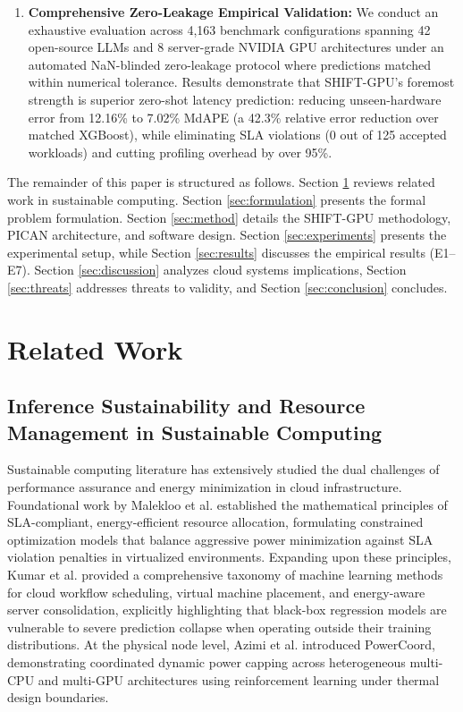 \documentclass[preprint,12pt]{elsarticle}
\begin{document}
\begin{enumerate}
    \item \textbf{Comprehensive Zero-Leakage Empirical Validation:} We conduct an exhaustive evaluation across 4,163 benchmark configurations spanning 42 open-source LLMs and 8 server-grade NVIDIA GPU architectures under an automated NaN-blinded zero-leakage protocol where predictions matched within numerical tolerance. Results demonstrate that SHIFT-GPU's foremost strength is superior zero-shot latency prediction: reducing unseen-hardware error from 12.16\% to 7.02\% MdAPE (a 42.3\% relative error reduction over matched XGBoost), while eliminating SLA violations (0 out of 125 accepted workloads) and cutting profiling overhead by over 95\%.
\end{enumerate}

The remainder of this paper is structured as follows. Section \ref{sec:related} reviews related work in sustainable computing. Section \ref{sec:formulation} presents the formal problem formulation. Section \ref{sec:method} details the SHIFT-GPU methodology, PICAN architecture, and software design. Section \ref{sec:experiments} presents the experimental setup, while Section \ref{sec:results} discusses the empirical results (E1--E7). Section \ref{sec:discussion} analyzes cloud systems implications, Section \ref{sec:threats} addresses threats to validity, and Section \ref{sec:conclusion} concludes.

\section{Related Work}
\label{sec:related}

\subsection{Inference Sustainability and Resource Management in Sustainable Computing}
Sustainable computing literature has extensively studied the dual challenges of performance assurance and energy minimization in cloud infrastructure. Foundational work by Malekloo et al. \citep{suscom_malekloo2018} established the mathematical principles of SLA-compliant, energy-efficient resource allocation, formulating constrained optimization models that balance aggressive power minimization against SLA violation penalties in virtualized environments. Expanding upon these principles, Kumar et al. \citep{suscom_kumar2022} provided a comprehensive taxonomy of machine learning methods for cloud workflow scheduling, virtual machine placement, and energy-aware server consolidation, explicitly highlighting that black-box regression models are vulnerable to severe prediction collapse when operating outside their training distributions. At the physical node level, Azimi et al. \citep{suscom_powercoord2020} introduced PowerCoord, demonstrating coordinated dynamic power capping across heterogeneous multi-CPU and multi-GPU architectures using reinforcement learning under thermal design boundaries.
\end{document}
